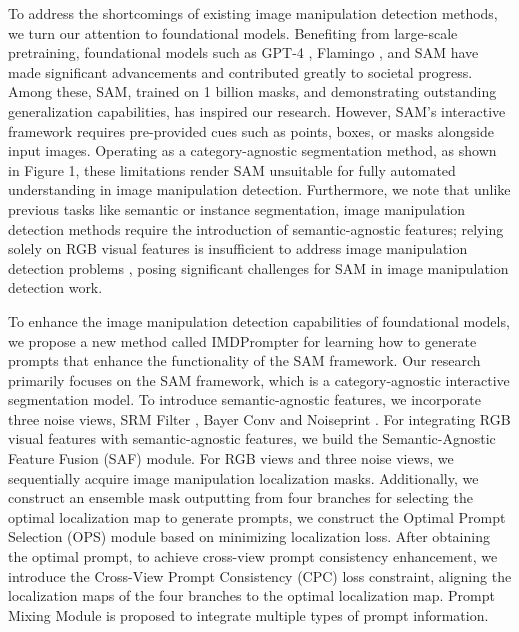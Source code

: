To address the shortcomings of existing image manipulation detection methods, we turn our attention to foundational models. Benefiting from large-scale pretraining, foundational models such as GPT-4 \cite{achiam2023gpt}, Flamingo \cite{alayrac2022flamingo}, and SAM \cite{kirillov2023segment} have made significant advancements and contributed greatly to societal progress. Among these, SAM, trained on 1 billion masks, and demonstrating outstanding generalization capabilities, has inspired our research. However, SAM's interactive framework requires pre-provided cues such as points, boxes, or masks alongside input images. Operating as a category-agnostic segmentation method, as shown in Figure 1, these limitations render SAM unsuitable for fully automated understanding in image manipulation detection. Furthermore, we note that unlike previous tasks like semantic or instance segmentation, image manipulation detection methods require the introduction of semantic-agnostic features; relying solely on RGB visual features is insufficient to address image manipulation detection problems  \cite{chen2021image}, posing significant challenges for SAM in image manipulation detection work.


To enhance the image manipulation detection capabilities of foundational models, we propose a new method called IMDPrompter for learning how to generate prompts that enhance the functionality of the SAM framework. Our research primarily focuses on the SAM framework, which is a category-agnostic interactive segmentation model. To introduce semantic-agnostic features, we incorporate three noise views, SRM Filter \cite{zhou2018learning}, Bayer Conv \cite{bayar2018constrained}  and Noiseprint \cite{cozzolino2019noiseprint}. For integrating RGB visual features with semantic-agnostic features, we build the Semantic-Agnostic Feature Fusion (SAF) module. For RGB views and three noise views, we sequentially acquire image manipulation localization masks. Additionally, we construct an ensemble mask outputting from four branches for selecting the optimal localization map to generate prompts, we construct the Optimal Prompt Selection (OPS) module based on minimizing localization loss. After obtaining the optimal prompt, to achieve cross-view prompt consistency enhancement, we introduce the Cross-View Prompt Consistency (CPC) loss constraint, aligning the localization maps of the four branches to the optimal localization map. Prompt Mixing Module is proposed to integrate multiple types of prompt information.

